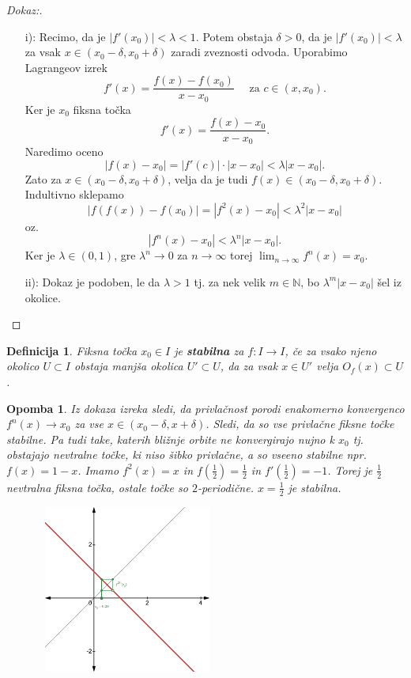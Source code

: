 \documentclass{article}
\newtheorem{definicija}{Definicija}
\newtheorem{opomba}{Opomba}
\newcommand{\N}{\mathbb{N}}
\begin{document}
\begin{proof}[Dokaz:]
\hfil
\begin{enumerate}
\item[i):] Recimo, da je $|f'(x_0)| < \lambda < 1$. Potem obstaja $\delta > 0$, da je $|f'(x_0)| < \lambda$ za vsak $x\in (x_0 - \delta, x_0 + \delta)$ zaradi zveznosti odvoda. Uporabimo Lagrangeov izrek
$$
f'(x) = \frac{f(x) - f(x_0)}{x - x_0} \quad \text{ za } c\in (x, x_0).
$$
Ker je $x_0$ fiksna točka
$$
f'(x) = \frac{f(x) - x_0}{x - x_0}.
$$
Naredimo oceno 
$$
|f(x) - x_0| = |f'(c)|\cdot |x - x_0| < \lambda |x - x_0|. 
$$
Zato za $x\in (x_0 - \delta, x_0 + \delta)$, velja da je tudi $f(x) \in (x_0 - \delta, x_0 + \delta)$. Indultivno sklepamo
$$
|f(f(x)) - f(x_0)| = |f^2(x) - x_0| < \lambda^2 |x - x_0|
$$
oz. 
$$
|f^n(x) - x_0| < \lambda^n |x - x_0|.
$$
Ker je $\lambda \in (0, 1)$, gre $\lambda^n \rightarrow 0$ za $n\rightarrow \infty$ torej $\lim_{n\rightarrow \infty} f^n(x) = x_0$.
\item[ii):] Dokaz je podoben, le da $\lambda > 1$ tj. za nek velik $m\in \N$, bo $\lambda^m |x - x_0|$ šel iz okolice.
\end{enumerate}
\end{proof}

\begin{definicija}
Fiksna točka $x_0 \in I$ je \textbf{stabilna} za $f:I \rightarrow I$, če za vsako njeno okolico $U \subset I$ obstaja manjša okolica $U' \subset U$, da za vsak $x\in U'$ velja $O_f(x) \subset U$.
\end{definicija}

\begin{opomba}
Iz dokaza izreka sledi, da privlačnost porodi enakomerno konvergenco 
$f^n(x) \rightarrow x_0$ za vse $x\in (x_0 - \delta, x + \delta)$.
Sledi, da so vse privlačne fiksne točke stabilne. 
Pa tudi take, katerih bližnje orbite ne konvergirajo nujno k $x_0$ tj. obstajajo 
nevtralne točke, ki niso šibko privlačne, a so vseeno stabilne npr. 
$f(x) = 1 - x$. Imamo $f^2(x) = x$ in $f(\frac{1}{2}) = \frac{1}{2}$ in 
$f'(\frac{1}{2}) = -1$. Torej je $\frac{1}{2}$ nevtralna fiksna točka, ostale 
točke so $2$-periodične. $x = \frac{1}{2}$ je stabilna.
\begin{figure}[h!]
    \begin{centering}
        \includegraphics[width=6cm, height=5.5cm]{Grafi/cobweb5.png}
    \end{centering}
    \end{figure}    
\end{opomba}
\end{document}
